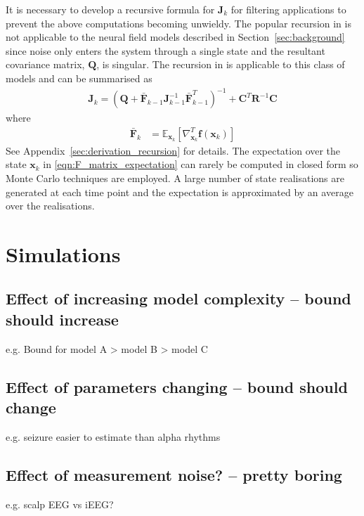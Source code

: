 \documentclass{article}
\renewcommand{\vec}[1]{\ensuremath{{\boldsymbol #1}}}
\newcommand{\mat}[1]{\ensuremath{\boldsymbol{#1}}}
\begin{document}
It is necessary to develop a recursive formula for $\mat J_k$ for filtering applications to prevent the above computations becoming unwieldy. The popular recursion in \cite{Tichavsky1998} is not applicable to the neural field models described in Section~\ref{sec:background} since noise only enters the system through a single state and the resultant covariance matrix, $\mat Q$, is singular. The recursion in \cite{Bergman2001} is applicable to this class of models and can be summarised as 
\begin{align}
	\mat J_k = \left( \mat Q + \bar{\mat F}_{k-1} \mat J_{k-1}^{-1} \bar{\mat F}_{k-1}^T\right)^{-1} + \mat C^T \mat R^{-1} \mat C
\end{align}
where
\begin{align}
		\bar{\mat F}_k &= \mathbb E_{\vec x_k} \left[ \nabla_{\vec x_k}^T \vec f(\vec x_k)\right] 
		\label{eqn:F_matrix_expectation}
\end{align}
See Appendix~\ref{sec:derivation_recursion} for details. The expectation over the state $\vec x_k$ in \eqref{eqn:F_matrix_expectation} can rarely be computed in closed form so Monte Carlo techniques are employed. A large number of state realisations are generated at each time point and the expectation is approximated by an average over the realisations.


\section{Simulations}

\subsection{Effect of increasing model complexity -- bound should increase}

e.g. Bound for model A > model B > model C

\subsection{Effect of parameters changing -- bound should change}

e.g. seizure easier to estimate than alpha rhythms

\subsection{Effect of measurement noise? -- pretty boring}

e.g. scalp EEG vs iEEG?
\end{document}
